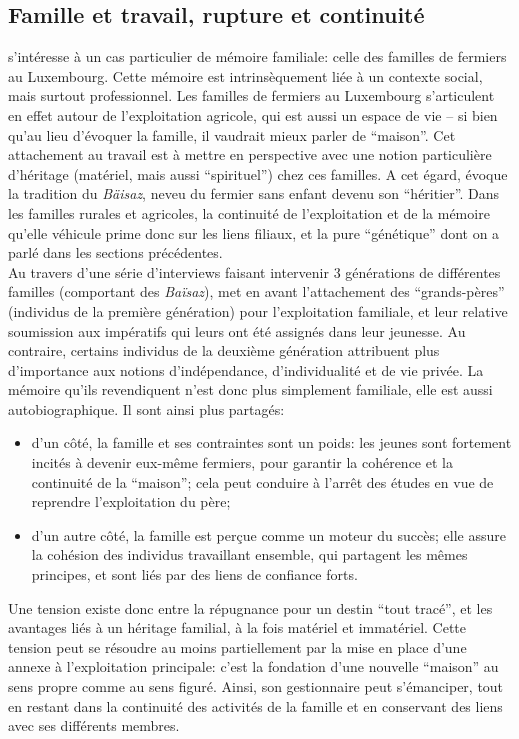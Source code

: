 \documentclass[french]{article}
\begin{document}
		\subsection{Famille et travail, rupture et continuité}
			\cite{boesen2012} s'intéresse à un cas particulier de mémoire familiale: celle des familles de fermiers au Luxembourg. Cette mémoire est intrinsèquement liée à un contexte social, mais surtout professionnel. Les familles de fermiers au Luxembourg s'articulent en effet autour de l'exploitation agricole, qui est aussi un espace de vie -- si bien qu'au lieu d'évoquer la famille, il vaudrait mieux parler de ``maison''. Cet attachement au travail est à mettre en perspective avec une notion particulière d'héritage (matériel, mais aussi ``spirituel'') chez ces familles. A cet égard, \cite{boesen2012} évoque la tradition du \textit{Bäisaz}, neveu du fermier sans enfant devenu son ``héritier''. Dans les familles rurales et agricoles, la continuité de l'exploitation et de la mémoire qu'elle véhicule prime donc sur les liens filiaux, et la pure ``génétique'' dont on a parlé dans les sections précédentes.\\
			
			Au travers d'une série d'interviews faisant intervenir 3 générations de différentes familles (comportant des \textit{Baïsaz}), \cite{boesen2012} met en avant l'attachement des ``grands-pères'' (individus de la première génération) pour l'exploitation familiale, et leur relative soumission aux impératifs qui leurs ont été assignés dans leur jeunesse. Au contraire, certains individus de la deuxième génération attribuent plus d'importance aux notions d'indépendance, d'individualité et de vie privée. La mémoire qu'ils revendiquent n'est donc plus simplement familiale, elle est aussi autobiographique. Il sont ainsi plus partagés:
			\begin{itemize}
				\item d'un côté, la famille et ses contraintes sont un poids: les jeunes sont fortement incités à devenir eux-même fermiers, pour garantir la cohérence et la continuité de la ``maison''; cela peut conduire à l'arrêt des études en vue de reprendre l'exploitation du père;
				\item d'un autre côté, la famille est perçue comme un moteur du succès; elle assure la cohésion des individus travaillant ensemble, qui partagent les mêmes principes, et sont liés par des liens de confiance forts.
			\end{itemize}
			Une tension existe donc entre la répugnance pour un destin ``tout tracé'', et les avantages liés à un héritage familial, à la fois matériel et immatériel. Cette tension peut se résoudre au moins partiellement par la mise en place d'une annexe à l'exploitation principale: c'est la fondation d'une nouvelle ``maison'' au sens propre comme au sens figuré. Ainsi, son gestionnaire peut s'émanciper, tout en restant dans la continuité des activités de la famille et en conservant des liens avec ses différents membres.\\
			
\end{document}
